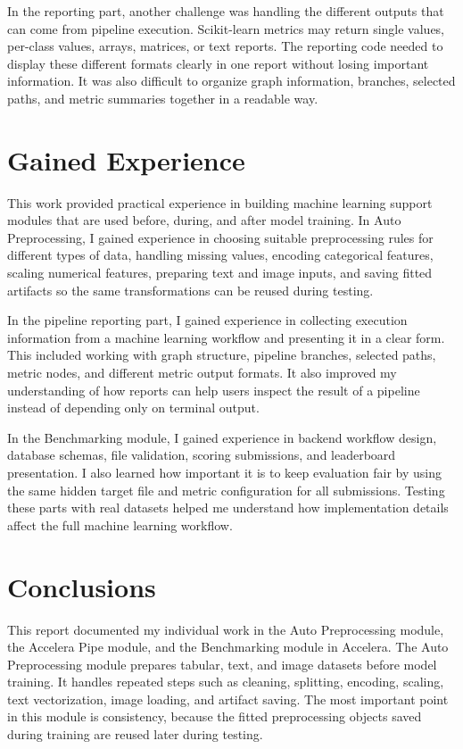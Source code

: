 \documentclass[12pt,a4paper,oneside]{report}
\begin{document}
\noindent In the reporting part, another challenge was handling the different outputs
that can come from pipeline execution. Scikit-learn metrics may return single
values, per-class values, arrays, matrices, or text reports. The reporting code
needed to display these different formats clearly in one report without losing
important information. It was also difficult to organize graph information,
branches, selected paths, and metric summaries together in a readable way.

\section{Gained Experience}
This work provided practical experience in building machine learning support
modules that are used before, during, and after model training. In Auto
Preprocessing, I gained experience in choosing suitable preprocessing rules for
different types of data, handling missing values, encoding categorical features,
scaling numerical features, preparing text and image inputs, and saving fitted
artifacts so the same transformations can be reused during testing.

\noindent In the pipeline reporting part, I gained experience in collecting execution
information from a machine learning workflow and presenting it in a clear form.
This included working with graph structure, pipeline branches, selected paths,
metric nodes, and different metric output formats. It also improved my
understanding of how reports can help users inspect the result of a pipeline
instead of depending only on terminal output.

\noindent In the Benchmarking module, I gained experience in backend workflow design,
database schemas, file validation, scoring submissions, and leaderboard
presentation. I also learned how important it is to keep evaluation fair by
using the same hidden target file and metric configuration for all submissions.
Testing these parts with real datasets helped me understand how implementation
details affect the full machine learning workflow.

\section{Conclusions}

This report documented my individual work in the Auto Preprocessing module,
the Accelera Pipe module, and the Benchmarking module in Accelera. The
Auto Preprocessing module prepares tabular, text, and image datasets before
model training. It handles repeated steps such as cleaning, splitting,
encoding, scaling, text vectorization, image loading, and artifact saving. The
most important point in this module is consistency, because the fitted
preprocessing objects saved during training are reused later during testing.
\end{document}
